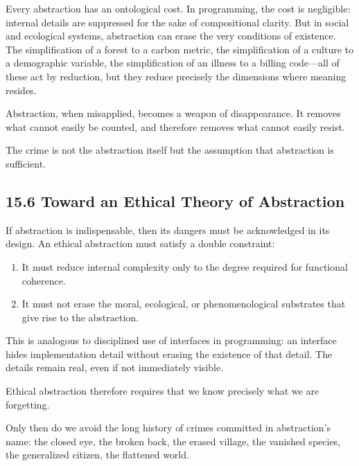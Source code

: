 \documentclass[12pt,letterpaper]{article}
\theoremstyle{remark}
\begin{document}
Every abstraction has an ontological cost. In programming, the cost is negligible: internal details are suppressed for the sake of compositional clarity. But in social and ecological systems, abstraction can erase the very conditions of existence. The simplification of a forest to a carbon metric, the simplification of a culture to a demographic variable, the simplification of an illness to a billing code—all of these act by reduction, but they reduce precisely the dimensions where meaning resides.

Abstraction, when misapplied, becomes a weapon of disappearance. It removes what cannot easily be counted, and therefore removes what cannot easily resist.

The crime is not the abstraction itself but the assumption that abstraction is sufficient.

\subsection{15.6 Toward an Ethical Theory of Abstraction}

If abstraction is indispensable, then its dangers must be acknowledged in its design. An ethical abstraction must satisfy a double constraint:

\begin{enumerate}
\item It must reduce internal complexity only to the degree required for functional coherence.
\item It must not erase the moral, ecological, or phenomenological substrates that give rise to the abstraction.
\end{enumerate}

This is analogous to disciplined use of interfaces in programming: an interface hides implementation detail without erasing the existence of that detail. The details remain real, even if not immediately visible.

Ethical abstraction therefore requires that we know precisely what we are forgetting.

Only then do we avoid the long history of crimes committed in abstraction’s name: the closed eye, the broken back, the erased village, the vanished species, the generalized citizen, the flattened world.

\newpage

\end{document}
